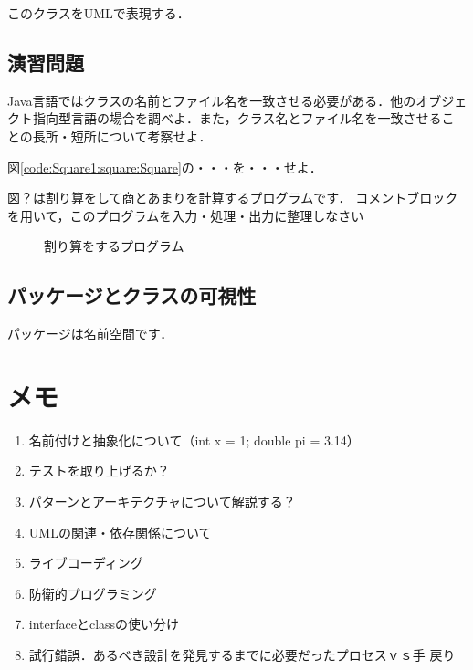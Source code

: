 \documentclass[a4j,papersize]{jsbook}
\begin{document}
このクラスをUMLで表現する．

\section{演習問題}

\begin{演習}
 Java言語ではクラスの名前とファイル名を一致させる必要がある．他のオブジェ
 クト指向型言語の場合を調べよ．また，クラス名とファイル名を一致させるこ
 との長所・短所について考察せよ．
\end{演習}

\begin{演習}
 図\ref{code:Square1:square:Square}の・・・を・・・せよ．
\end{演習}

\begin{演習}
 図？は割り算をして商とあまりを計算するプログラムです．
 コメントブロックを用いて，このプログラムを入力・処理・出力に整理しなさい
 \end{演習}
 
\begin{figure}

\caption{割り算をするプログラム} 
\end{figure}

\section{パッケージとクラスの可視性}
パッケージは名前空間です．

\chapter{メモ}

\begin{enumerate}
 \item 名前付けと抽象化について（int x = 1; double pi = 3.14）
 \item テストを取り上げるか？
 \item パターンとアーキテクチャについて解説する？
 \item UMLの関連・依存関係について
 \item ライブコーディング
 \item 防衛的プログラミング
 \item interfaceとclassの使い分け
 \item 試行錯誤．あるべき設計を発見するまでに必要だったプロセスｖｓ手
       戻り
\end{enumerate}
\end{document}
